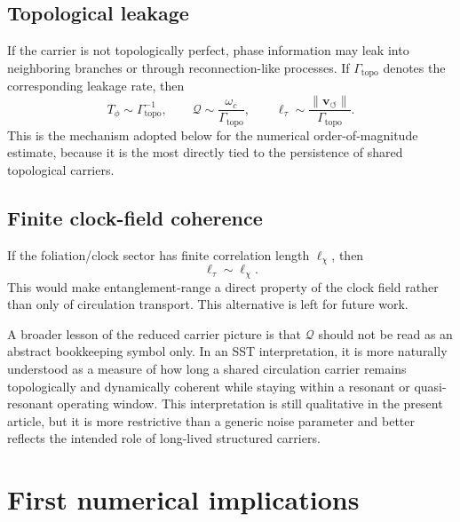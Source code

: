 \documentclass[11pt]{article}
\newcommand{\vnorm}{\lVert \mathbf{v}_{\!\boldsymbol{\circlearrowleft}}\rVert}
\begin{document}
        \subsection{Topological leakage}
            If the carrier is not topologically perfect, phase information may leak into neighboring branches or through reconnection-like processes. If \(\Gamma_{\mathrm{topo}}\) denotes the corresponding leakage rate, then
            \begin{equation}
                T_\phi\sim \Gamma_{\mathrm{topo}}^{-1},
                \qquad
                \mathcal{Q}\sim \frac{\omega_c}{\Gamma_{\mathrm{topo}}},
                \qquad
                \ell_\tau\sim \frac{\vnorm}{\Gamma_{\mathrm{topo}}}.
                \label{eq:Q_topo}
            \end{equation}
            This is the mechanism adopted below for the numerical order-of-magnitude estimate, because it is the most directly tied to the persistence of shared topological carriers.
        
        \subsection{Finite clock-field coherence}
            If the foliation/clock sector has finite correlation length \(\ell_\chi\), then
            \begin{equation}
                \ell_\tau\sim \ell_\chi.
                \label{eq:l_chi}
            \end{equation}
            This would make entanglement-range a direct property of the clock field rather than only of circulation transport.
            This alternative is left for future work.

        A broader lesson of the reduced carrier picture is that \(\mathcal{Q}\) should not be read as an abstract bookkeeping symbol only. In an SST interpretation, it is more naturally understood as a measure of how long a shared circulation carrier remains topologically and dynamically coherent while staying within a resonant or quasi-resonant operating window. This interpretation is still qualitative in the present article, but it is more restrictive than a generic noise parameter and better reflects the intended role of long-lived structured carriers.
    
    \section{First numerical implications}
        
\end{document}
